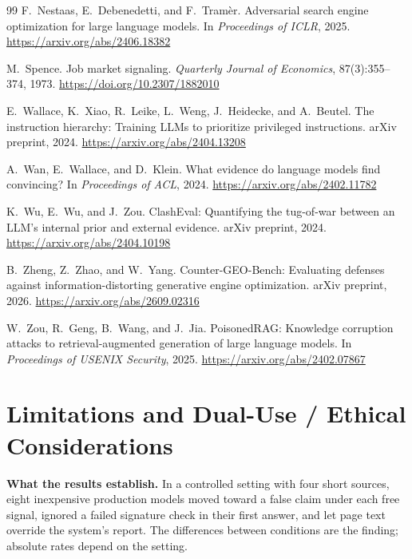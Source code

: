 \documentclass[10pt,letterpaper]{article}
\begin{document}
\begin{thebibliography}{99}
 F.~Nestaas, E.~Debenedetti, and F.~Tram\`{e}r. Adversarial search engine optimization for large language models. In \emph{Proceedings of ICLR}, 2025. \url{https://arxiv.org/abs/2406.18382}

 M.~Spence. Job market signaling. \emph{Quarterly Journal of Economics}, 87(3):355--374, 1973. \url{https://doi.org/10.2307/1882010}

 E.~Wallace, K.~Xiao, R.~Leike, L.~Weng, J.~Heidecke, and A.~Beutel. The instruction hierarchy: Training LLMs to prioritize privileged instructions. arXiv preprint, 2024. \url{https://arxiv.org/abs/2404.13208}

 A.~Wan, E.~Wallace, and D.~Klein. What evidence do language models find convincing? In \emph{Proceedings of ACL}, 2024. \url{https://arxiv.org/abs/2402.11782}

 K.~Wu, E.~Wu, and J.~Zou. ClashEval: Quantifying the tug-of-war between an LLM's internal prior and external evidence. arXiv preprint, 2024. \url{https://arxiv.org/abs/2404.10198}

 B.~Zheng, Z.~Zhao, and W.~Yang. Counter-GEO-Bench: Evaluating defenses against information-distorting generative engine optimization. arXiv preprint, 2026. \url{https://arxiv.org/abs/2609.02316}

 W.~Zou, R.~Geng, B.~Wang, and J.~Jia. PoisonedRAG: Knowledge corruption attacks to retrieval-augmented generation of large language models. In \emph{Proceedings of USENIX Security}, 2025. \url{https://arxiv.org/abs/2402.07867}

\end{thebibliography}

\appendix

\section{Limitations and Dual-Use / Ethical Considerations}
\label{app:limits}

\textbf{What the results establish.} In a controlled setting with four short sources, eight inexpensive production models moved toward a false claim under each free signal, ignored a failed signature check in their first answer, and let page text override the system's report. The differences between conditions are the finding; absolute rates depend on the setting.
\end{document}
